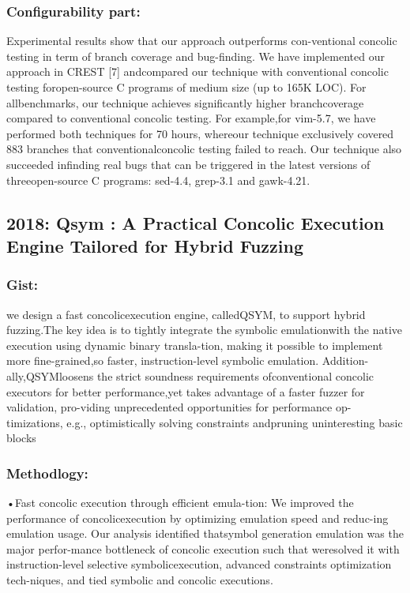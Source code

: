 \documentclass[	runningheads,
				a4paper]{llncs}
\begin{document}
\subsubsection{Configurability part:}
Experimental results show that our approach outperforms con-ventional concolic testing in term of branch coverage and bug-finding. We have implemented our approach in CREST [7] andcompared our technique with conventional concolic testing foropen-source C programs of medium size (up to 165K LOC). For allbenchmarks, our technique achieves significantly higher branchcoverage compared to conventional concolic testing. For example,for vim-5.7, we have performed both techniques for 70 hours, whereour technique exclusively covered 883 branches that conventionalconcolic testing failed to reach. Our technique also succeeded infinding real bugs that can be triggered in the latest versions of threeopen-source C programs: sed-4.4, grep-3.1 and gawk-4.21.


\subsection{2018: Qsym : A Practical Concolic Execution Engine Tailored for Hybrid Fuzzing}
\subsubsection{Gist:}
we design a fast concolicexecution engine, calledQSYM, to support hybrid fuzzing.The key idea is to tightly integrate the symbolic emulationwith the native execution using dynamic binary transla-tion, making it possible to implement more fine-grained,so faster, instruction-level symbolic emulation. Addition-ally,QSYMloosens the strict soundness requirements ofconventional concolic executors for better performance,yet takes advantage of a faster fuzzer for validation, pro-viding unprecedented opportunities for performance op-timizations, e.g., optimistically solving constraints andpruning uninteresting basic blocks

\subsubsection{Methodlogy:}
•Fast concolic execution through efficient emula-tion:
We  improved  the  performance  of  concolicexecution by optimizing emulation speed and reduc-ing emulation usage.  Our analysis identified thatsymbol generation emulation was the major perfor-mance bottleneck of concolic execution such that weresolved it with instruction-level selective symbolicexecution, advanced constraints optimization tech-niques, and tied symbolic and concolic executions.
\end{document}
